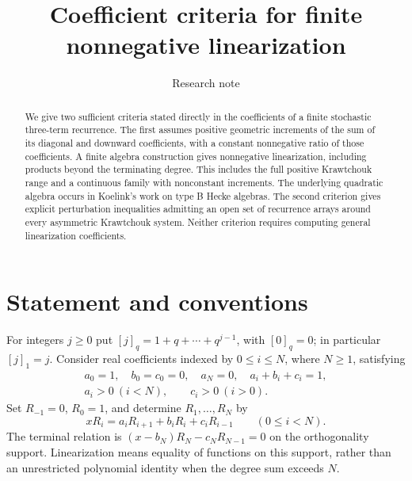 \documentclass[11pt]{article}
\title{Coefficient criteria for finite nonnegative linearization}
\author{Research note}
\date{}
\begin{document}
\maketitle

\begin{abstract}
We give two sufficient criteria stated directly in the coefficients of a finite stochastic three-term recurrence. The first assumes positive geometric increments of the sum of its diagonal and downward coefficients, with a constant nonnegative ratio of those coefficients. A finite algebra construction gives nonnegative linearization, including products beyond the terminating degree. This includes the full positive Krawtchouk range and a continuous family with nonconstant increments. The underlying quadratic algebra occurs in Koelink's work on type B Hecke algebras. The second criterion gives explicit perturbation inequalities admitting an open set of recurrence arrays around every asymmetric Krawtchouk system. Neither criterion requires computing general linearization coefficients.
\end{abstract}

\section{Statement and conventions}
For integers $j\geq0$ put $[j]_q=1+q+\cdots+q^{j-1}$, with $[0]_q=0$; in particular $[j]_1=j$.
Consider real coefficients indexed by $0\leq i\leq N$, where $N\geq1$, satisfying
\begin{equation}\label{eq:basic}
\begin{gathered}
a_0=1,\quad b_0=c_0=0,\quad a_N=0,\quad a_i+b_i+c_i=1,\\
a_i>0\ (i<N),\qquad c_i>0\ (i>0).
\end{gathered}
\end{equation}
Set $R_{-1}=0$, $R_0=1$, and determine $R_1,\ldots,R_N$ by
\begin{equation}\label{eq:recurrence}
xR_i=a_iR_{i+1}+b_iR_i+c_iR_{i-1}\qquad(0\leq i<N).
\end{equation}
The terminal relation is $(x-b_N)R_N-c_NR_{N-1}=0$ on the orthogonality support. Linearization means equality of functions on this support, rather than an unrestricted polynomial identity when the degree sum exceeds $N$.
\end{document}
